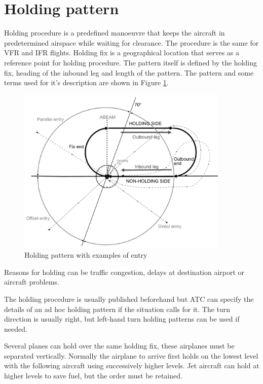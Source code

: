 \section{Holding pattern}

Holding procedure is a predefined manoeuvre that keeps the aircraft in predetermined airspace while waiting for clearance. The procedure is the same for VFR and IFR flights. Holding fix is a geographical location that serves as a reference point for holding procedure. The pattern itself is defined by the holding fix, heading of the inbound leg and length of the pattern. \cite[Chapter 6]{doc4444} The pattern and some terms used for it's description are shown in Figure \ref{fig:holding}.

\begin{figure}[h]
    \centering
    \includegraphics[width=0.9\textwidth]{figures/holding.png}
    \caption{Holding pattern with examples of entry}
    \label{fig:holding}
\end{figure}

Reasons for holding can be traffic congestion, delays at destination airport or aircraft problems.

The holding procedure is usually published beforehand but ATC can specify the details of an ad hoc holding pattern if the situation calls for it. The turn direction is usually right, but left-hand turn holding patterns can be used if needed.

Several planes can hold over the same holding fix, these airplanes must be separated vertically. Normally the airplane to arrive first holds on the lowest level with the following aircraft using successively higher levels. Jet aircraft can hold at higher levels to save fuel, but the order must be retained.\cite[Chapter 6]{doc4444}

